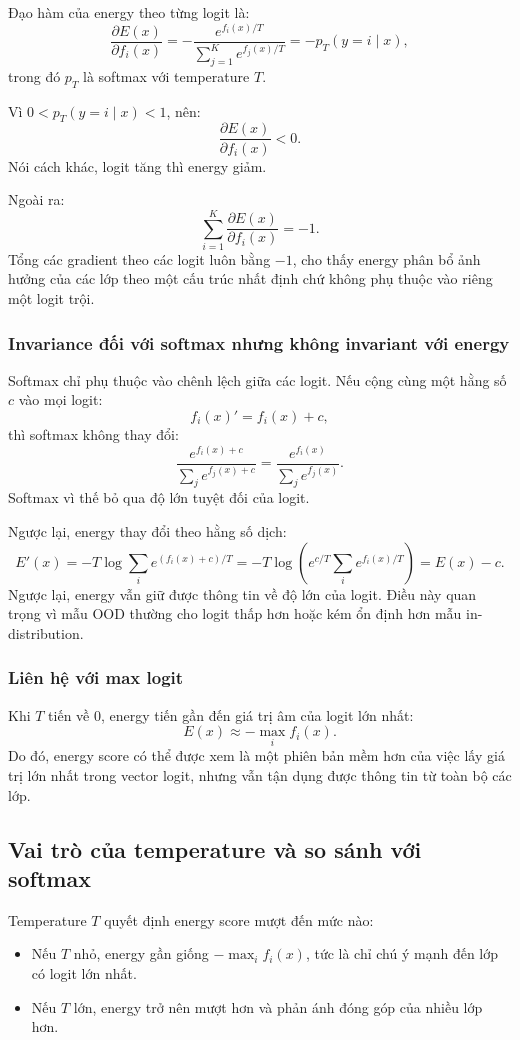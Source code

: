 \documentclass[12pt,a4paper]{article}
\begin{document}
Đạo hàm của energy theo từng logit là:
\[
\frac{\partial E(x)}{\partial f_i(x)}
= -\frac{e^{f_i(x)/T}}{\sum_{j=1}^{K} e^{f_j(x)/T}}
= -p_T(y=i \mid x),
\]
trong đó $p_T$ là softmax với temperature $T$.

Vì $0 < p_T(y=i \mid x) < 1$, nên:
\[
\frac{\partial E(x)}{\partial f_i(x)} < 0.
\]
Nói cách khác, logit tăng thì energy giảm.

Ngoài ra:
\[
\sum_{i=1}^{K} \frac{\partial E(x)}{\partial f_i(x)} = -1.
\]
Tổng các gradient theo các logit luôn bằng $-1$, cho thấy energy phân bổ ảnh hưởng của các lớp theo một cấu trúc nhất định chứ không phụ thuộc vào riêng một logit trội.

\subsubsection{Invariance đối với softmax nhưng không invariant với energy}

Softmax chỉ phụ thuộc vào chênh lệch giữa các logit. Nếu cộng cùng một hằng số $c$ vào mọi logit:
\[
f_i(x)' = f_i(x) + c,
\]
thì softmax không thay đổi:
\[
\frac{e^{f_i(x)+c}}{\sum_j e^{f_j(x)+c}}
=
\frac{e^{f_i(x)}}{\sum_j e^{f_j(x)}}.
\]
Softmax vì thế bỏ qua độ lớn tuyệt đối của logit.

Ngược lại, energy thay đổi theo hằng số dịch:
\[
E'(x) = -T \log \sum_i e^{(f_i(x)+c)/T}
= -T \log \left(e^{c/T}\sum_i e^{f_i(x)/T}\right)
= E(x) - c.
\]
Ngược lại, energy vẫn giữ được thông tin về độ lớn của logit. Điều này quan trọng vì mẫu OOD thường cho logit thấp hơn hoặc kém ổn định hơn mẫu in-distribution.

\subsubsection{Liên hệ với max logit}

Khi $T$ tiến về 0, energy tiến gần đến giá trị âm của logit lớn nhất:
\[
E(x) \approx -\max_i f_i(x).
\]
Do đó, energy score có thể được xem là một phiên bản mềm hơn của việc lấy giá trị lớn nhất trong vector logit, nhưng vẫn tận dụng được thông tin từ toàn bộ các lớp.

\subsection{Vai trò của temperature và so sánh với softmax}

Temperature $T$ quyết định energy score mượt đến mức nào:

\begin{itemize}
  \item Nếu $T$ nhỏ, energy gần giống $-\max_i f_i(x)$, tức là chỉ chú ý mạnh đến lớp có logit lớn nhất.
  \item Nếu $T$ lớn, energy trở nên mượt hơn và phản ánh đóng góp của nhiều lớp hơn.
\end{itemize}
\end{document}
